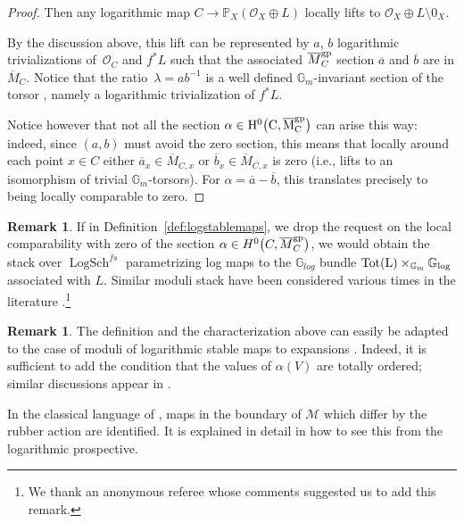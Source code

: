 \documentclass[pdftex]{sigma}
\newcommand{\M}{\mathcal{M}}
\renewcommand{\O}{\mathcal{O}}
\renewcommand{\bar}{\overline}
\numberwithin{equation}{section}
\theoremstyle{definition}
\newtheorem{remarkk}[theo]{Remark}
\begin{document}
\begin{proof}
Then any logarithmic map $C\to \mathbb P_X(\mathcal O_X\oplus L)$ locally lifts to $\O_X\oplus L\setminus 0_X$.

By the discussion above, this lift can be represented by $a$, $b$ logarithmic trivializations of~$\mathcal O_C$ and $f^*L$ such that the associated $\bar{M}_C^{\rm gp}$ section $\bar{a}$ and $\bar{b}$ are in $\bar{M}_C$. Notice that the ratio~${\lambda=ab^{-1}}$ is a well defined $\mathbb G_m$-invariant section of the torsor , namely a logarithmic trivialization of $f^*L$.

Notice however that not all the section $\alpha\in \rm{H}^0\bigl(C,\bar{M}_{C}^{\rm gp}\bigr)$ can arise this way: indeed, since $(a,b)$ must avoid the zero section, this means that locally around each point $x\in C$ either $\bar{a}_x\in \bar{M}_{C,x} $ or $\bar{b}_x\in\bar{M}_{C,x}$ is zero (i.e., lifts to an isomorphism of trivial $\mathbb G_m$-torsors). For $\alpha=\bar{a}-\bar{b}$, this translates precisely to being locally comparable to zero.
\end{proof}

\begin{remarkk}
If in Definition~\ref{def:logstablemaps}, we drop the request on the local comparability with zero of the section $\alpha\in H^0\bigl(C,\bar{M}_C^{\rm gp}\bigr)$, we would obtain the stack over $\operatorname{LogSch}^{fs}$ parametrizing log maps to the $\mathbb G_{log}$ bundle $\rm{Tot}(L)\times_{\mathbb G_m}\mathbb G_{log}$ associated with $L$. Similar moduli stack have been considered various times in the literature \cite{marcuswiselog,ranganathan2024logarithmic,RSPW2,ranganathan2020rational}.\footnote{We thank an anonymous referee whose comments suggested us to add this remark.}
\end{remarkk}

\begin{remarkk}
The definition and the characterization above can easily be adapted to the case of moduli of logarithmic stable maps to expansions \cite{kim2010logarithmic,li2001stable,maulik2023logarithmic}. Indeed, it is sufficient to add the condition that the values of $\alpha(V)$ are totally ordered; similar discussions appear in \cite{marcuswiselog,ranganathan2024logarithmic}.

In the classical language of \cite{li2001stable}, maps in the boundary of $\M$ which differ by the rubber action are identified. It is explained in detail in \cite{CN} how to see this from the logarithmic prospective.
\end{remarkk}
\end{document}
